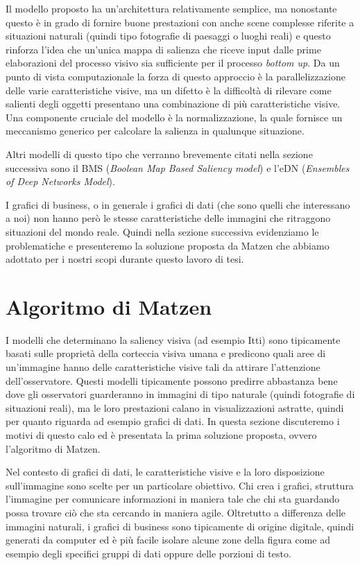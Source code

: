 \documentclass[%
	corpo=12pt,
    twoside,
    stile=classica,
    oldstyle,
    tipotesi=custom,
    greek,
    evenboxes,
]{toptesi}
\begin{document}
{Il modello proposto ha un'architettura relativamente semplice, ma nonostante questo è in grado di fornire buone prestazioni con anche scene complesse riferite a situazioni naturali (quindi tipo fotografie di paesaggi o luoghi reali) e questo rinforza l'idea che un'unica mappa di salienza che riceve input dalle prime elaborazioni del processo visivo sia sufficiente per il processo \textit{bottom up}. Da un punto di vista computazionale la forza di questo approccio è la parallelizzazione delle varie caratteristiche visive, ma un difetto è la difficoltà di rilevare come salienti degli oggetti presentano una combinazione di più caratteristiche visive. Una componente cruciale del modello è la normalizzazione, la quale fornisce un meccanismo generico per calcolare la salienza in qualunque situazione. 

Altri modelli di questo tipo che verranno brevemente citati nella sezione successiva sono il BMS (\textit{Boolean Map Based Saliency model}) e l'eDN (\textit{Ensembles of Deep Networks Model}).

I grafici di business, o in generale i grafici di dati (che sono quelli che interessano a noi) non hanno però le stesse caratteristiche delle immagini che ritraggono situazioni del mondo reale. Quindi nella sezione successiva evidenziamo le problematiche e presenteremo la soluzione proposta da Matzen che abbiamo adottato per i nostri scopi durante questo lavoro di tesi.



\section{Algoritmo di Matzen}

I modelli che determinano la saliency visiva (ad esempio Itti) sono tipicamente basati sulle proprietà della corteccia visiva umana e predicono quali aree di un'immagine hanno delle caratteristiche visive tali da attirare l'attenzione dell'osservatore. Questi modelli tipicamente possono predirre abbastanza bene dove gli osservatori guarderanno in immagini di tipo naturale (quindi fotografie di situazioni reali), ma le loro prestazioni calano in visualizzazioni astratte, quindi per quanto riguarda ad esempio grafici di dati. In questa sezione discuteremo i motivi di questo calo ed è presentata la prima soluzione proposta, ovvero l'algoritmo di Matzen. 

Nel contesto di grafici di dati, le caratteristiche visive e la loro disposizione sull'immagine sono scelte per un particolare obiettivo. Chi crea i grafici, struttura l'immagine per comunicare informazioni in maniera tale che chi sta guardando possa trovare ciò che sta cercando in maniera agile. Oltretutto a differenza delle immagini naturali, i grafici di business sono tipicamente di origine digitale, quindi generati da computer ed è più facile isolare alcune zone della figura come ad esempio degli specifici gruppi di dati oppure delle porzioni di testo. 

}
\end{document}
